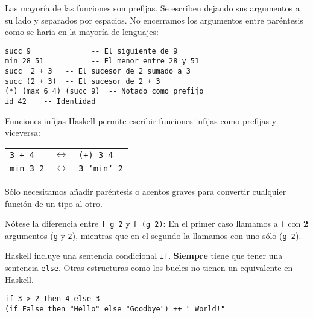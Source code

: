 Las mayoría de las funciones son prefijas. Se escriben dejando sus argumentos a
su lado y separados por espacios. No encerramos los argumentos entre paréntesis
como se haría en la mayoría de lenguajes:

\begin{lstlisting}
succ 9				-- El siguiente de 9
min 28 51			-- El menor entre 28 y 51
succ  2 + 3   -- El sucesor de 2 sumado a 3
succ (2 + 3)  -- El sucesor de 2 + 3
(*) (max 6 4) (succ 9)	-- Notado como prefijo
id 42	 -- Identidad
\end{lstlisting}

\begin{extra}{Funciones infijas}
Haskell permite escribir funciones infijas como prefijas y viceversa:

\espacio

\begin{tabular}{lcl}
  \texttt{3 + 4} & $\longleftrightarrow$ & \texttt{(+) 3 4} \\
  \texttt{min 3 2} & $\longleftrightarrow$ & \texttt{3 `min` 2}\\
\end{tabular}

\espacio

Sólo necesitamos añadir paréntesis o acentos graves para convertir
cualquier función de un tipo al otro.
\end{extra}

Nótese la diferencia entre \texttt{f g 2} y \texttt{f (g 2)}: En el primer caso
llamamos a \texttt{f} con \textbf{2} argumentos (\texttt{g} y \texttt{2}), mientras
que en el segundo la llamamos con uno sólo (\texttt{g 2}).

Haskell incluye una sentencia condicional \texttt{if}.
\textbf{Siempre} tiene que tener una sentencia \texttt{else}.
Otras estructuras como los bucles no tienen un equivalente en Haskell.

\begin{lstlisting}
if 3 > 2 then 4 else 3
(if False then "Hello" else "Goodbye") ++ " World!"
\end{lstlisting}

\newpage
